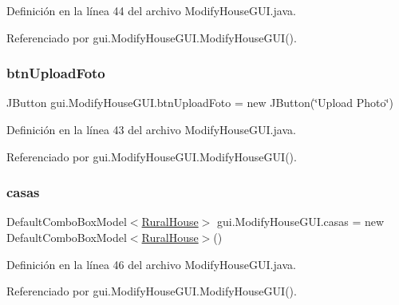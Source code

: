 Definición en la línea 44 del archivo Modify\+House\+G\+U\+I.\+java.



Referenciado por gui.\+Modify\+House\+G\+U\+I.\+Modify\+House\+G\+U\+I().

\mbox{\label{classgui_1_1_modify_house_g_u_i_a5c169d1fb8a40277b56fd291a48e97ab}} 
\subsubsection{\texorpdfstring{btnUploadFoto}{btnUploadFoto}}
{\footnotesize\ttfamily J\+Button gui.\+Modify\+House\+G\+U\+I.\+btn\+Upload\+Foto = new J\+Button(\char`\"{}Upload Photo\char`\"{})\hspace{0.3cm}{\ttfamily [private]}}



Definición en la línea 43 del archivo Modify\+House\+G\+U\+I.\+java.



Referenciado por gui.\+Modify\+House\+G\+U\+I.\+Modify\+House\+G\+U\+I().

\mbox{\label{classgui_1_1_modify_house_g_u_i_ae3c3ed3425d3b0bf7c1b901ae52ddcdf}} 
\subsubsection{\texorpdfstring{casas}{casas}}
{\footnotesize\ttfamily Default\+Combo\+Box\+Model$<$\mbox{\hyperlink{classdomain_1_1_rural_house}{Rural\+House}}$>$ gui.\+Modify\+House\+G\+U\+I.\+casas = new Default\+Combo\+Box\+Model$<$\mbox{\hyperlink{classdomain_1_1_rural_house}{Rural\+House}}$>$()\hspace{0.3cm}{\ttfamily [private]}}



Definición en la línea 46 del archivo Modify\+House\+G\+U\+I.\+java.



Referenciado por gui.\+Modify\+House\+G\+U\+I.\+Modify\+House\+G\+U\+I().

\mbox{\label{classgui_1_1_modify_house_g_u_i_a7bb13be5defa74715359f06a41fb5dad}} 
